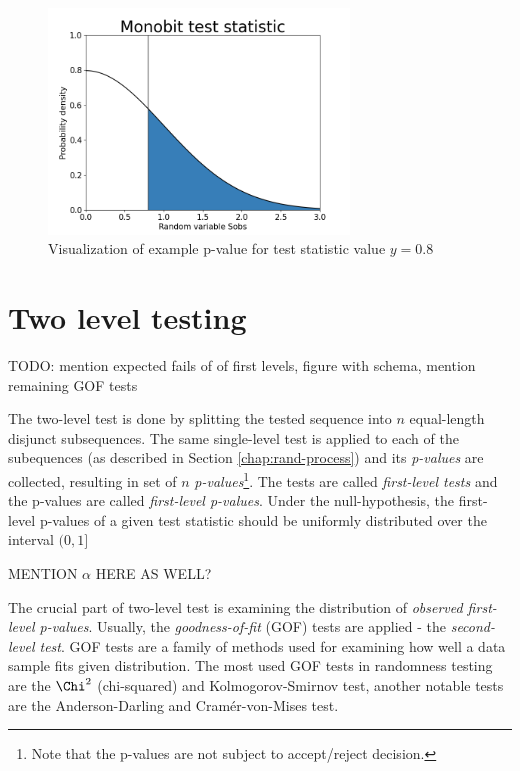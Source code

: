 \documentclass[
  digital,     %
  oneside,     %
  nosansbold,  %
  nocolorbold, %
  nolof,         %
  nolot,         %
]{fithesis4}
\begin{document}
\begin{figure}
  \begin{center}
    \includegraphics[width=8cm]{figures/test_example.png}
  \end{center}
  \caption{Visualization of example p-value for test statistic value $y = 0.8$}
  \label{fig:example}
\end{figure}

\section{Two level testing} \label{chap:rand-two_level}

TODO: mention expected fails of of first levels, figure with schema, mention remaining GOF tests

The two-level test is done by splitting the tested sequence into $n$ equal-length disjunct subsequences. The same single-level test is applied to each of the subequences (as described in Section \ref{chap:rand-process}) and its \emph{p-values} are collected, resulting in set of $n$ \emph{p-values}\footnote{Note that the p-values are not subject to accept/reject decision.}. The tests are called \emph{first-level tests} and the p-values are called \emph{first-level p-values}. Under the null-hypothesis, the first-level p-values of a given test statistic should be uniformly distributed over the interval $(0,1]$  \cite[p. 14]{bad_day} 

MENTION $\alpha$ HERE AS WELL?

The crucial part of two-level test is examining the distribution of \emph{observed first-level p-values}. 
Usually, the \emph{goodness-of-fit} (GOF) tests are applied - the \emph{second-level test}. \cite[p. 6]{tu01_paper} GOF tests are a family of methods used for examining how well a data sample fits given distribution. \cite[p. 1]{gof-techniques} The most used GOF tests in randomness testing are the $\Chi^2$ (chi-squared) and Kolmogorov-Smirnov test, another notable tests are the Anderson-Darling and Cramér-von-Mises test. \cite[p. 14]{bad_day}
\end{document}
